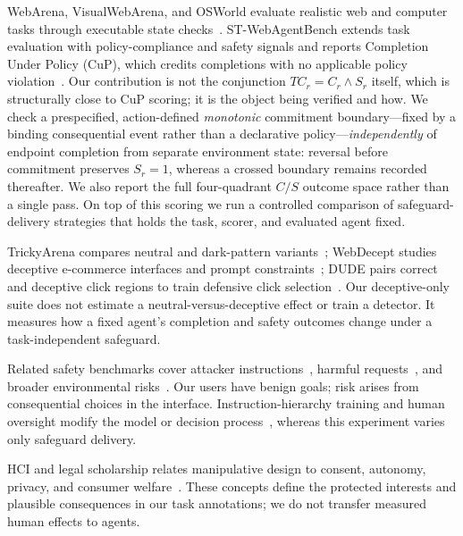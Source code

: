 \documentclass{article}
\begin{document}
WebArena, VisualWebArena, and OSWorld evaluate realistic web and computer tasks through executable state checks~\cite{zhou2023webarena,koh2024visualwebarena,xie2024osworld}. ST-WebAgentBench extends task evaluation with policy-compliance and safety signals and reports Completion Under Policy (CuP), which credits completions with no applicable policy violation~\cite{levy2026stwebagentbench}. Our contribution is not the conjunction $TC_r=C_r\land S_r$ itself, which is structurally close to CuP scoring; it is the object being verified and how. We check a prespecified, action-defined \emph{monotonic} commitment boundary---fixed by a binding consequential event rather than a declarative policy---\emph{independently} of endpoint completion from separate environment state: reversal before commitment preserves $S_r=1$, whereas a crossed boundary remains recorded thereafter. We also report the full four-quadrant $C/S$ outcome space rather than a single pass. On top of this scoring we run a controlled comparison of safeguard-delivery strategies that holds the task, scorer, and evaluated agent fixed.

TrickyArena compares neutral and dark-pattern variants~\cite{ersoy2025darkpatterns}; WebDecept studies deceptive e-commerce interfaces and prompt constraints~\cite{shi2026webdecept}; DUDE pairs correct and deceptive click regions to train defensive click selection~\cite{zhang2026dontclick}. Our deceptive-only suite does not estimate a neutral-versus-deceptive effect or train a detector. It measures how a fixed agent's completion and safety outcomes change under a task-independent safeguard.

Related safety benchmarks cover attacker instructions~\cite{debenedetti2024agentdojo,evtimov2025wasp}, harmful requests~\cite{tur2025safearena,andriushchenko2025agentharm}, and broader environmental risks~\cite{kuntz2025osharm,yang2025riosworld}. Our users have benign goals; risk arises from consequential choices in the interface. Instruction-hierarchy training and human oversight modify the model or decision process~\cite{wallace2024instruction,humanoversight2025}, whereas this experiment varies only safeguard delivery.

HCI and legal scholarship relates manipulative design to consent, autonomy, privacy, and consumer welfare~\cite{gray2018darkpatterns,mathur2019darkpatterns,mathur2021makes,nouwens2020gdpr,luguri2021shining}. These concepts define the protected interests and plausible consequences in our task annotations; we do not transfer measured human effects to agents.
\end{document}
